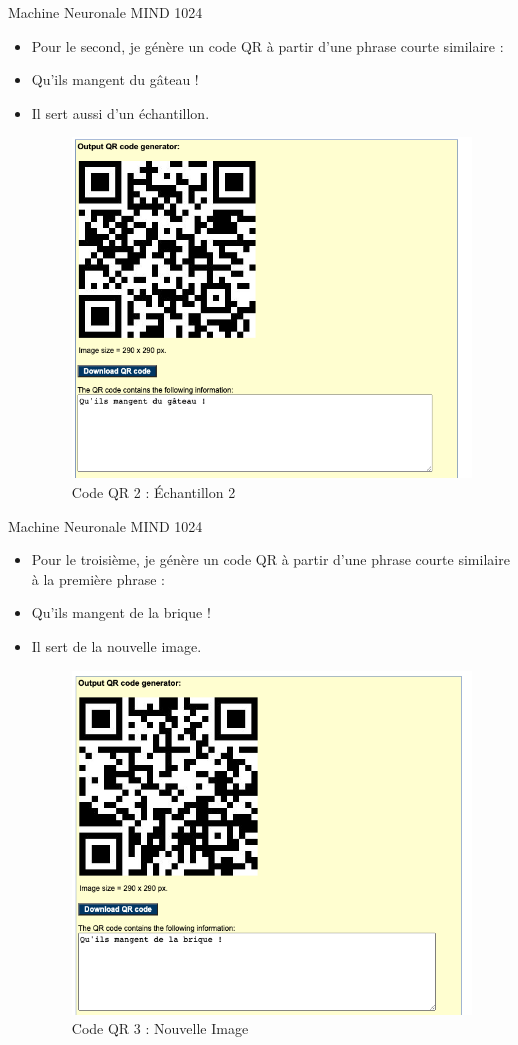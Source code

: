 \documentclass{beamer}
\begin{document}
\begin{frame}{Machine Neuronale MIND 1024}
    \begin{itemize}[<+-| alert@+>] %
        \item Pour le second, je génère un code QR à partir d'une phrase courte similaire :
        \item \og Qu'ils mangent du gâteau !\fg{}
        \item Il sert aussi d'un échantillon.
        \begin{figure}
            \centering
            \includegraphics[width=0.5\linewidth]{pic/qr2.png}
            \caption{Code QR 2 : Échantillon 2}
        \end{figure}
    \end{itemize}
\end{frame}

\begin{frame}{Machine Neuronale MIND 1024}
    \begin{itemize}[<+-| alert@+>] %
        \item Pour le troisième, je génère un code QR à partir d'une phrase courte similaire à la première phrase :
        \item \og Qu'ils mangent de la brique !\fg{}
        \item Il sert de la nouvelle image.
        \begin{figure}
            \centering
            \includegraphics[width=0.5\linewidth]{pic/qr3.png}
            \caption{Code QR 3 : Nouvelle Image}
        \end{figure}
    \end{itemize}
\end{frame}
\end{document}
